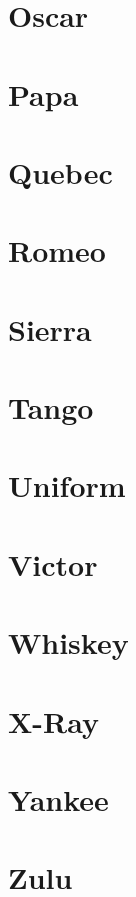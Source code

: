 \documentclass[oneside]{book}
\begin{document}
\section{Oscar}
\section{Papa}
\section{Quebec}
\section{Romeo}
\section{Sierra}
\section{Tango}
\section{Uniform}
\section{Victor}
\section{Whiskey}
\section{X-Ray}
\section{Yankee}
\section{Zulu}
\end{document}
